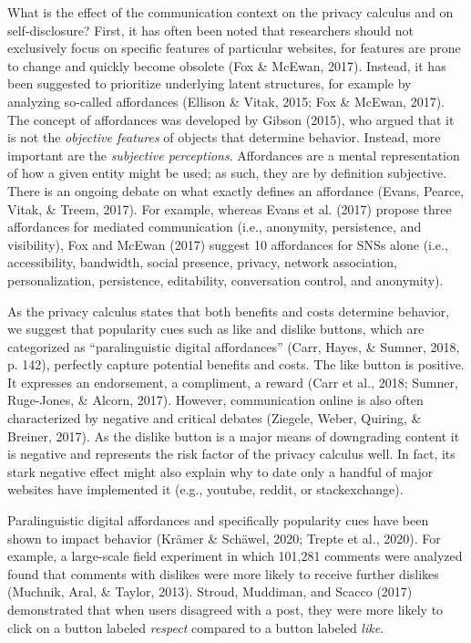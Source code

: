 \documentclass[
  english,
  man,floatsintext]{apa6}
\begin{document}
What is the effect of the communication context on the privacy calculus and on self-disclosure?
First, it has often been noted that researchers should not exclusively focus on specific features of particular websites, for features are prone to change and quickly become obsolete (Fox \& McEwan, 2017).
Instead, it has been suggested to prioritize underlying latent structures, for example by analyzing so-called affordances (Ellison \& Vitak, 2015; Fox \& McEwan, 2017).
The concept of affordances was developed by Gibson (2015), who argued that it is not the \emph{objective features} of objects that determine behavior.
Instead, more important are the \emph{subjective perceptions}.
Affordances are a mental representation of how a given entity might be used; as such, they are by definition subjective.
There is an ongoing debate on what exactly defines an affordance (Evans, Pearce, Vitak, \& Treem, 2017).
For example, whereas Evans et al. (2017) propose three affordances for mediated communication (i.e., anonymity, persistence, and visibility), Fox and McEwan (2017) suggest 10 affordances for SNSs alone (i.e., accessibility, bandwidth, social presence, privacy, network association, personalization, persistence, editability, conversation control, and anonymity).

As the privacy calculus states that both benefits and costs determine behavior, we suggest that popularity cues such as like and dislike buttons, which are categorized as \enquote{paralinguistic digital affordances} (Carr, Hayes, \& Sumner, 2018, p. 142), perfectly capture potential benefits and costs.
The like button is positive.
It expresses an endorsement, a compliment, a reward (Carr et al., 2018; Sumner, Ruge-Jones, \& Alcorn, 2017).
However, communication online is also often characterized by negative and critical debates (Ziegele, Weber, Quiring, \& Breiner, 2017).
As the dislike button is a major means of downgrading content it is negative and represents the risk factor of the privacy calculus well.
In fact, its stark negative effect might also explain why to date only a handful of major websites have implemented it (e.g., youtube, reddit, or stackexchange).

Paralinguistic digital affordances and specifically popularity cues have been shown to impact behavior (Krämer \& Schäwel, 2020; Trepte et al., 2020).
For example, a large-scale field experiment in which 101,281 comments were analyzed found that comments with dislikes were more likely to receive further dislikes (Muchnik, Aral, \& Taylor, 2013).
Stroud, Muddiman, and Scacco (2017) demonstrated that when users disagreed with a post, they were more likely to click on a button labeled \emph{respect} compared to a button labeled \emph{like}.
\end{document}
